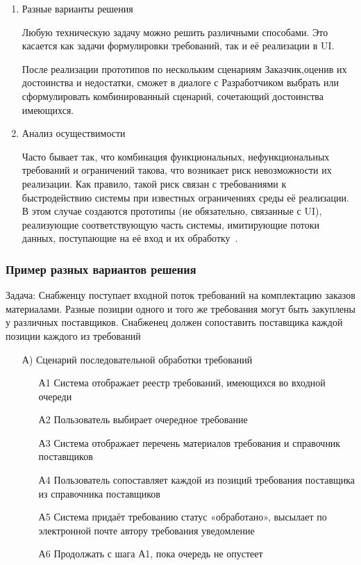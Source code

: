 \documentclass{../industrial-development}
\begin{document}
{\begin{enumerate}
\item \alert{Разные варианты решения}

Любую техническую задачу можно решить различными способами. Это касается как задачи формулировки требований, так и её реализации в UI.

После реализации прототипов по нескольким сценариям Заказчик,оценив их достоинства и недостатки, сможет в диалоге с Разработчиком выбрать или сформулировать комбинированный сценарий, сочетающий достоинства имеющихся.

\item \alert{Анализ осуществимости}

Часто бывает так, что комбинация функциональных, нефункциональных требований и ограничений такова, что возникает риск невозможности
их реализации. Как правило, такой риск связан с требованиями к быстродействию системы при известных ограничениях среды её реализации. В этом случае создаются прототипы (не обязательно, связанные с UI), реализующие соответствующую часть системы, имитирующие потоки данных, поступающие на её вход и их обработку~\cite[с.~51--52]{Maglinec}.

\end{enumerate}

\begin{frame} \frametitle {Пример разных вариантов решения}
\alert{Задача}: Снабженцу поступает входной поток требований на комплектацию заказов материалами. Разные позиции одного и того же требования могут быть закуплены у различных поставщиков. Снабженец должен сопоставить поставщика каждой позиции каждого из требований

\begin{itemize}
\item[А)] Сценарий последовательной обработки требований
\begin{itemize}
\item[А1] Система отображает реестр требований, имеющихся во входной очереди
\item[А2] Пользователь выбирает очередное требование
\item[А3] Система отображает перечень материалов требования и справочник
поставщиков
\item[А4] Пользователь сопоставляет каждой из позиций требования поставщика из справочника поставщиков
\item[А5] Система придаёт требованию статус «обработано», высылает по электронной почте автору требования уведомление
\item[А6] Продолжать с шага А1, пока очередь не опустеет
\end{itemize}
\end{itemize}
\end{frame}

}
\end{document}
